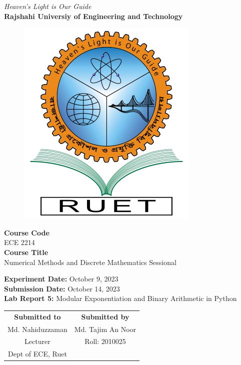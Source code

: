 \vspace*{\fill}
\begin{center}

    \emph{Heaven's Light is Our Guide} \\
    \textbf{Rajshahi Universiy of Engineering and Technology} \\

    \begin{figure}[H]
        \centering
        \includegraphics[scale=.34]{images/RUET_logo.png}
        \label{fig:ruet_logo}
    \end{figure}
    \vspace{5mm}

    \textbf{Course Code}\\
    ECE 2214\\
    \vspace{3mm}
    \textbf{Course Title}\\
    Numerical Methods and Discrete Mathematics Sessional

    \vspace{5mm}
    \textbf{Experiment Date:} October 9, 2023\\
    \textbf{Submission Date:} {October 14, 2023}\\

    \vspace{5mm}
    \textbf{Lab Report 5:} Modular Exponentiation and Binary Arithmetic in Python

    \vspace{15mm}

    \begin{tabular}{c|c}
        \textbf{Submitted to} & \textbf{Submitted by} \\
        Md. Nahiduzzaman      & Md. Tajim An Noor     \\
        Lecturer              & Roll: 2010025         \\
        Dept of ECE, Ruet     &                       \\
    \end{tabular}

\end{center}
\vspace*{\fill}
